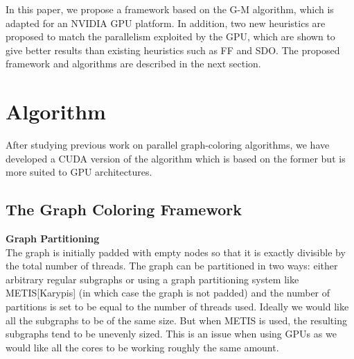 \documentclass[preprint]{sigplanconf}
\begin{document}
In this paper, we propose a framework based on the G-M algorithm, which is adapted for an NVIDIA GPU platform.  In addition, two new heuristics are proposed to match the parallelism exploited by the GPU, which are shown to give better results than existing heuristics such as FF and SDO. The proposed framework and algorithms are described in the next section.

\section{Algorithm}

After studying previous work on parallel graph-coloring algorithms, we have developed a CUDA version of the algorithm which is based on the former but is more suited to GPU architectures.

\subsection{The Graph Coloring Framework}

\begin{algorithm}
\begin{algorithmic}
\linebreak 
{}
	
	\ENDWHILE

		
\end{algorithmic}
\end{algorithm}  


\textbf{Graph Partitioning}\\
The graph is initially padded with empty nodes so that it is exactly divisible by the total number of threads. The graph can be partitioned in two ways: either arbitrary regular subgraphs or using a graph partitioning system like METIS[Karypis] (in which case the graph is not padded) and the number of partitions is set to be equal to the number of threads used.
Ideally we would like all the subgraphs to be of the same size. But when METIS is used, the resulting subgraphs tend to be unevenly sized. This is an issue when using GPUs as we would like all the cores to be working roughly the same amount.\
\end{document}
